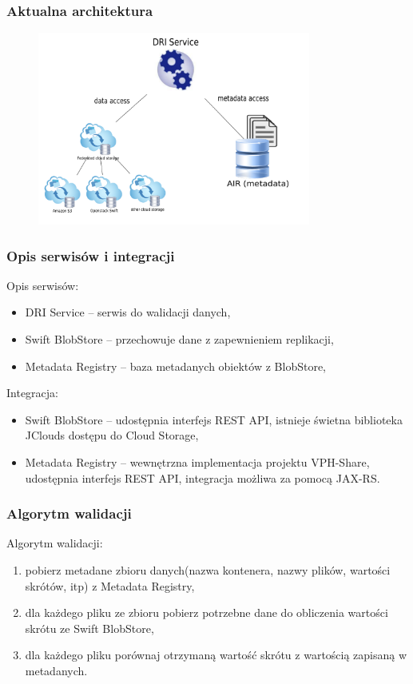\documentclass{beamer}
\begin{document}
\begin{frame}
\frametitle{Aktualna architektura}

\begin{figure}
\includegraphics[width=0.8\textwidth]{schemat.pdf}
\end{figure}
\end{frame}

\begin{frame}
\frametitle{Opis serwisów i integracji}

\begin{block}{Opis serwisów:}
\begin{itemize}
	\item DRI Service -- serwis do walidacji danych,
	\item Swift BlobStore -- przechowuje dane z zapewnieniem replikacji,
	\item Metadata Registry -- baza metadanych obiektów z BlobStore,
\end{itemize}
\end{block}

\begin{block}{Integracja:}
\begin{itemize}
	\item Swift BlobStore -- udostępnia interfejs REST API, istnieje świetna biblioteka JClouds dostępu do Cloud Storage,
	\item Metadata Registry -- wewnętrzna implementacja projektu VPH-Share, udostępnia interfejs REST API, integracja możliwa za pomocą JAX-RS.
\end{itemize}
\end{block}
\end{frame}

\begin{frame}
\frametitle{Algorytm walidacji}

\begin{block}{Algorytm walidacji:}
\begin{enumerate}
	\item pobierz metadane zbioru danych(nazwa kontenera, nazwy plików, wartości skrótów, itp) z Metadata Registry,
	\item dla każdego pliku ze zbioru pobierz potrzebne dane do obliczenia wartości skrótu ze Swift BlobStore,
	\item dla każdego pliku porównaj otrzymaną wartość skrótu z wartością zapisaną w metadanych.
\end{enumerate}
\end{block}
\end{frame}
\end{document}
